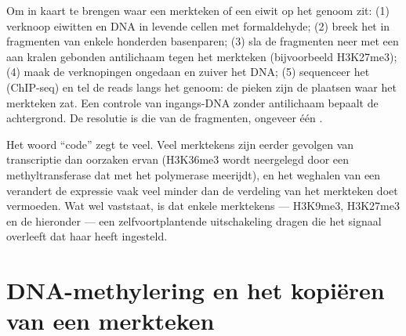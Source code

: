 \begin{method}\label{met:b3:chromatin-epigenetics:chip}
Om in kaart te brengen waar een merkteken of een eiwit op het genoom
zit: (1) verknoop eiwitten en DNA in levende cellen met formaldehyde;
(2) breek het  in fragmenten van enkele honderden
basenparen; (3) sla de fragmenten neer met een aan kralen gebonden
antilichaam tegen het merkteken (bijvoorbeeld H3K27me3); (4) maak de
verknopingen ongedaan en zuiver het DNA; (5) sequenceer het (ChIP-seq)
en tel de reads langs het genoom: de pieken zijn de plaatsen waar het
merkteken zat. Een controle van ingangs-DNA zonder antilichaam bepaalt
de achtergrond. De resolutie is die van de fragmenten, ongeveer één
.
\end{method}

\begin{remark}\label{rem:b3:chromatin-epigenetics:code}
Het woord ``code'' zegt te veel. Veel merktekens zijn eerder gevolgen
van transcriptie dan oorzaken ervan (H3K36me3 wordt neergelegd door
een methyltransferase dat met het polymerase meerijdt), en het
weghalen van een  verandert de expressie vaak veel minder dan
de verdeling van het merkteken doet vermoeden. Wat wel vaststaat, is
dat enkele merktekens --- H3K9me3, H3K27me3 en de 
hieronder --- een zelfvoortplantende uitschakeling dragen die het
signaal overleeft dat haar heeft ingesteld.
\end{remark}

\section{DNA-methylering en het kopiëren van een merkteken}


